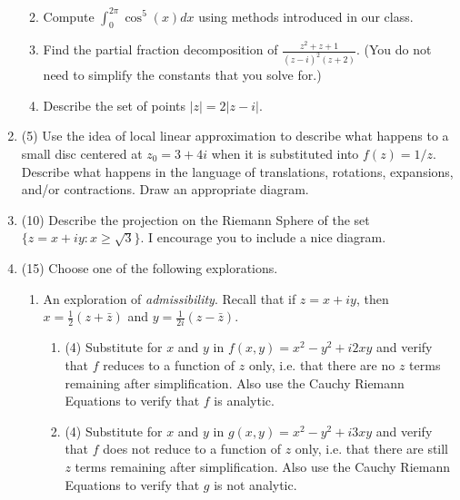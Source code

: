 \documentclass[11pt]{article}
\begin{document}
\begin{enumerate}
\begin{enumerate}
\begin{mdframed}[align=left]
\begin{center}
	\end{center}
  \end{mdframed}
  
  \item Compute ${\displaystyle \int_0^{2\pi}} \cos^5(x)dx$ using methods introduced in our class.
  
  \item Find the partial fraction decomposition of ${\displaystyle \frac{z^2 + z + 1}{(z - i)^2 (z + 2)}}$. (You do not need to simplify the constants that you solve for.)
  
  \item Describe the set of points $|z| = 2|z - i|$.
  
  \end{enumerate}

\item (5) Use the idea of local linear approximation to describe what happens to a small disc centered at $z_0 = 3 + 4i$ when it is substituted into $f(z) = 1/z$. Describe what happens in the language of translations, rotations, expansions, and/or contractions. Draw an appropriate diagram.


\item (10) Describe the projection on the Riemann Sphere of the set $\{z = x + iy : x \geq \sqrt{3}\}$. I encourage you to include a nice diagram.


\item (15) Choose one of the following explorations.
\begin{enumerate}
  \addtocounter{enumii}{1}
  \item  An exploration of {\it admissibility}. Recall that if $z = x + iy$, then $x = \frac{1}{2}(z + \bar{z})$ and $y = \frac{1}{2i}(z - \bar{z})$.
  
  \begin{enumerate}
  \item (4) Substitute for $x$ and $y$ in $f(x, y) = x^2 − y^2 + i2xy$ and verify that $f$ reduces to a function of $z$ only, i.e. that there are no $z$ terms remaining after simplification. Also use the Cauchy Riemann Equations to verify that $f$ is analytic.
    
  \item (4) Substitute for $x$ and $y$ in $g(x, y) = x^2 − y^2 + i3xy$ and verify that $f$ does not reduce to a function of $z$ only, i.e. that there are still $z$ terms remaining after simplification. Also use the Cauchy Riemann Equations to verify that $g$ is not analytic.


\end{enumerate}
\end{enumerate}
\end{enumerate}
\end{document}
